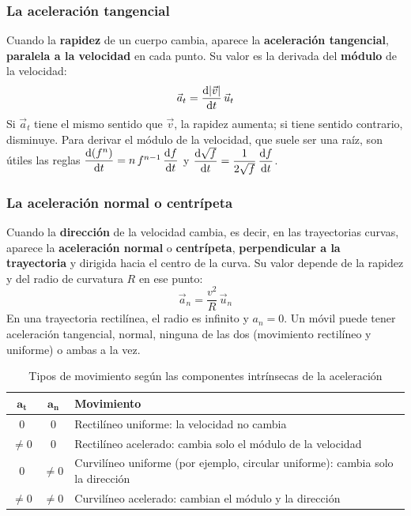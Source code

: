 \subsubsection{La aceleración tangencial}

Cuando la \textbf{rapidez} de un cuerpo cambia, aparece la \textbf{aceleración tangencial}, \textbf{paralela a la velocidad} en cada
punto. Su valor es la derivada del \textbf{módulo} de la velocidad:
\[ \vec a_t = \frac{\mathrm{d} |\vec v|}{\mathrm{d} t}\,\vec u_t \]
Si \(\vec a_t\) tiene el mismo sentido que \(\vec v\), la rapidez aumenta; si tiene sentido contrario, disminuye. Para derivar
el módulo de la velocidad, que suele ser una raíz, son útiles las reglas \(\dfrac{\mathrm{d}(f^n)}{\mathrm{d} t} = n\,f^{n - 1}\,\dfrac{\mathrm{d} f}{\mathrm{d} t}\)
y \(\dfrac{\mathrm{d}\sqrt f}{\mathrm{d} t} = \dfrac{1}{2\sqrt f}\,\dfrac{\mathrm{d} f}{\mathrm{d} t}\).

\subsubsection{La aceleración normal o centrípeta}

Cuando la \textbf{dirección} de la velocidad cambia, es decir, en las trayectorias curvas, aparece la \textbf{aceleración normal}
o \textbf{centrípeta}, \textbf{perpendicular a la trayectoria} y dirigida hacia el centro de la curva. Su valor depende de la
rapidez y del radio de curvatura \(R\) en ese punto:
\[ \vec a_n = \frac{v^2}{R}\,\vec u_n \]
En una trayectoria rectilínea, el radio es infinito y \(a_n = 0\). Un móvil puede tener aceleración tangencial, normal, ninguna de
las dos (movimiento rectilíneo y uniforme) o ambas a la vez.

\begin{table}[H]
    \centering
    \caption{Tipos de movimiento según las componentes intrínsecas de la aceleración}
    \vspace{-5pt}
    \begin{tabular}{@{}ccL{8cm}@{}}
        \toprule
        \(\boldsymbol{a_t}\) & \(\boldsymbol{a_n}\) & \textbf{Movimiento} \\
        \midrule
        \(0\) & \(0\) & Rectilíneo uniforme: la velocidad no cambia \\[3pt]
        \(\neq 0\) & \(0\) & Rectilíneo acelerado: cambia solo el módulo de la velocidad \\[3pt]
        \(0\) & \(\neq 0\) & Curvilíneo uniforme (por ejemplo, circular uniforme): cambia solo la dirección \\[3pt]
        \(\neq 0\) & \(\neq 0\) & Curvilíneo acelerado: cambian el módulo y la dirección \\
        \bottomrule
    \end{tabular}
    \label{tab:ud8-intrinsecas}
\end{table}

